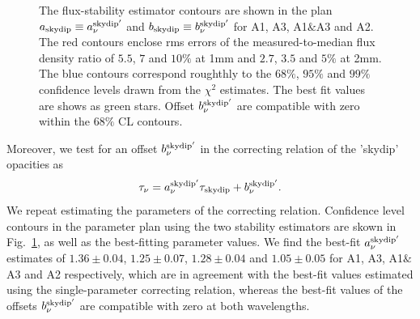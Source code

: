 \begin{figure}[ht!]
\begin{center}
{    The flux-stability estimator contours are shown in the plan
    $a_{\rm{skydip}} \equiv a_\nu^{\rm{skydip}'}$ and
    $b_{\rm{skydip}} \equiv b_\nu^{\rm{skydip}'}$
    for A1, A3, A1$\&$A3 and A2.
    The red contours enclose rms
    errors of the measured-to-median flux density ratio of $5.5$, $7$
    and $10\%$ at 1mm and $2.7$, $3.5$ and $5\%$ at 2mm. The blue
    contours correspond roughthly to the $68\%$, $95\%$ and $99\%$
    confidence levels drawn from the $\chi^2$ estimates.
    The best fit values are shows as green stars. Offset
    $b_\nu^{\rm{skydip}'}$ are compatible with zero within the $68\%$
    CL contours.} 
\label{fig:skydip_fit}
\end{center}
\end{figure}

Moreover, we test for an offset $b_\nu^{\rm{skydip}'}$ in the
correcting relation of the 'skydip' opacities as 
\begin{equation}  
  \tau_\nu =  a_\nu^{\rm{skydip}'}\tau_{\rm{skydip}} + b_\nu^{\rm{skydip}'}.      
\end{equation}
We repeat estimating the parameters of the correcting
relation. Confidence level contours in the parameter plan using the
two stability estimators are skown in Fig.~\ref{fig:skydip_fit}, as
well as the
best-fitting parameter values.
We find the best-fit $a_\nu^{\rm{skydip}'}$ estimates of
$1.36 \pm 0.04$,
$1.25 \pm 0.07$,
$1.28 \pm 0.04$ and
$1.05 \pm 0.05$ for A1, A3, A1$\&$A3 and A2 respectively, which are in
agreement with the best-fit values estimated using the single-parameter
correcting relation, whereas the best-fit values of the offsets
$b_\nu^{\rm{skydip}'}$ are compatible with zero at both wavelengths.


